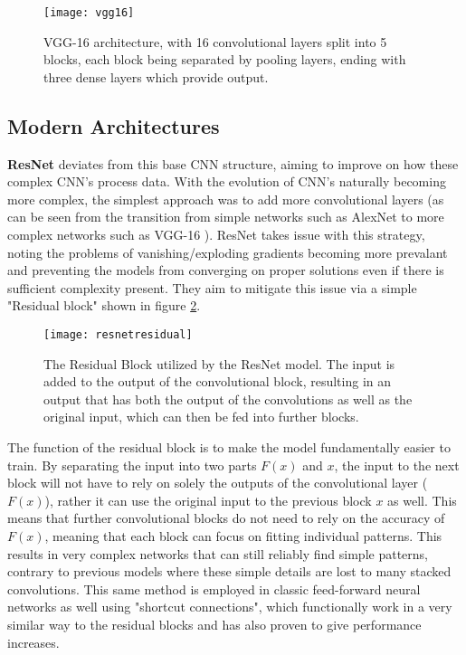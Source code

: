 \begin{figure}[ht]
	\texttt{[image: vgg16]}
	\centering
	\caption{VGG-16 \cite{vgg16} architecture, with 16 convolutional layers split into 5 blocks, each block being separated by pooling layers, ending with three dense layers which provide output.}
	\label{fig:vgg16}
\end{figure}

\subsection{Modern Architectures}

\textbf{ResNet} \cite{resnet} deviates from this base CNN structure, aiming to improve on how these complex CNN's process data. With the evolution of CNN's naturally becoming more complex, the simplest approach was to add more convolutional layers (as can be seen from the transition from simple networks such as AlexNet \cite{alexnet} to more complex networks such as VGG-16 \cite{vgg16}). ResNet takes issue with this strategy, noting the problems of vanishing/exploding gradients becoming more prevalant and preventing the models from converging on proper solutions even if there is sufficient complexity present. They aim to mitigate this issue via a simple "Residual block" shown in figure \ref{fig:resnetresidual}.

\begin{figure}[ht]
	\texttt{[image: resnetresidual]}
	\centering
	\caption{The Residual Block utilized by the ResNet \cite{resnet} model. The input is added to the output of the convolutional block, resulting in an output that has both the output of the convolutions as well as the original input, which can then be fed into further blocks.}
	\label{fig:resnetresidual}
\end{figure}

The function of the residual block is to make the model fundamentally easier to train. By separating the input into two parts $F(x)$ and $x$, the input to the next block will not have to rely on solely the outputs of the convolutional layer ($F(x)$), rather it can use the original input to the previous block $x$ as well. This means that further convolutional blocks do not need to rely on the accuracy of $F(x)$, meaning that each block can focus on fitting individual patterns. This results in very complex networks that can still reliably find simple patterns, contrary to previous models where these simple details are lost to many stacked convolutions. This same method is employed in classic feed-forward neural networks as well using "shortcut connections", which functionally work in a very similar way to the residual blocks and has also proven to give performance increases.

